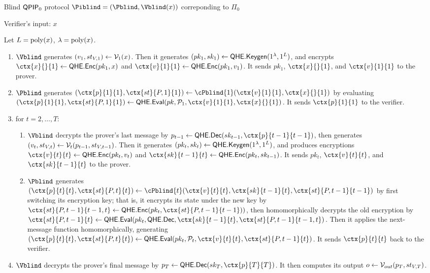 \begin{protocol}{Blind $\operatorname{\mathsf{QPIP}}_0$ protocol $\Piblind=(\Pblind, \Vblind(x))$ correponding to $\Pi_0$}

	Verifier's input: $x$

	Let $L=\operatorname*{\operatorname{poly}}(x)$, $\lambda=\operatorname*{\operatorname{poly}}(x)$.

	\begin{enumerate}
		\item $\Vblind$ generates $(v_1, st_{V, 1})\leftarrow\mathcal{V}_1(x)$.
			Then it generates $(pk_1, sk_1)\leftarrow\mathsf{QHE.Keygen}(1^\lambda, 1^L)$,
			and encrypts $\ctx{x}{}{1}\leftarrow\QEnc(pk_1, x)$ and $\ctx{v}{1}{1}\leftarrow\QEnc(pk_1, v_1)$.
			It sends $pk_1$, $\ctx{x}{}{1}$, and $\ctx{v}{1}{1}$ to the prover.
		\item $\Pblind$ generates $(\ctx{p}{1}{1}, \ctx{st}{P, 1}{1})\leftarrow\cPblind{1}(\ctx{v}{1}{1}, \ctx{x}{}{1})$
			by evaluating $(\ctx{p}{1}{1}, \ctx{st}{P, 1}{1})\leftarrow\QEval(pk, \cP_1, \ctx{v}{1}{1}, \ctx{x}{}{1})$.
			It sends $\ctx{p}{1}{1}$ to the verifier.
		\item for $t=2,\ldots,T$:
		\begin{enumerate}
			\item $\Vblind$ decrypts the prover's last message by $p_{t-1}\leftarrow\QDec(sk_{t-1}, \ctx{p}{t-1}{t-1})$,
				then generates $(v_t, st_{V, t})\leftarrow\mathcal{V}_t(p_{t-1}, st_{V, t-1})$.
				Then it generates $(pk_t, sk_t)\leftarrow\mathsf{QHE.Keygen}(1^\lambda, 1^L)$,
				and produces encryptions $\ctx{v}{t}{t}\leftarrow\QEnc(pk_t, v_t)$ and $\ctx{sk}{t-1}{t}\leftarrow\QEnc(pk_t, sk_{t-1})$.
				It sends $pk_t$, $\ctx{v}{t}{t}$, and $\ctx{sk}{t-1}{t}$ to the prover.
			\item $\Pblind$ generates $(\ctx{p}{t}{t}, \ctx{st}{P, t}{t})\leftarrow\cPblind{t}(\ctx{v}{t}{t}, \ctx{sk}{t-1}{t}, \ctx{st}{P, t-1}{t-1})$
				by first switching its encryption key;
				that is, it encrypts its state under the new key by $\ctx{st}{P, t-1}{t-1, t}\leftarrow\QEnc(pk_t, \ctx{st}{P, t-1}{t-1}))$,
				then homomorphically decrypts the old encryption by
				$\ctx{st}{P, t-1}{t}\leftarrow\QEval(pk_t, \QDec, \ctx{sk}{t-1}{t}, \ctx{st}{P, t-1}{t-1, t})$.
				Then it applies the next-message function homomorphically, generating
				$(\ctx{p}{t}{t}, \ctx{st}{P, t}{t})\leftarrow\QEval(pk_t, \cP_t, \ctx{v}{t}{t}, \ctx{st}{P, t-1}{t})$.
				It sends $\ctx{p}{t}{t}$ back to the verifier.
		\end{enumerate}
		\item $\Vblind$ decrypts the prover's final message by $p_T\leftarrow\QDec(sk_T, \ctx{p}{T}{T})$.
			It then computes its output $o\leftarrow\mathcal{V}_{out}(p_T, st_{V, T})$.
	\end{enumerate}
\end{protocol}

